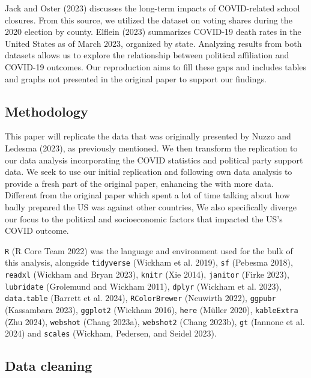 \documentclass[
  letterpaper,
  DIV=11,
  numbers=noendperiod]{scrartcl}
\begin{document}
Jack and Oster (2023) discusses the long-term impacts of COVID-related
school closures. From this source, we utilized the dataset on voting
shares during the 2020 election by county. Elflein (2023) summarizes
COVID-19 death rates in the United States as of March 2023, organized by
state. Analyzing results from both datasets allows us to explore the
relationship between political affiliation and COVID-19 outcomes. Our
reproduction aims to fill these gaps and includes tables and graphs not
presented in the original paper to support our findings.

\hypertarget{methodology}{%
\subsection{Methodology}\label{methodology}}

This paper will replicate the data that was originally presented by
Nuzzo and Ledesma (2023), as previously mentioned. We then transform the
replication to our data analysis incorporating the COVID statistics and
political party support data. We seek to use our initial replication and
following own data analysis to provide a fresh part of the original
paper, enhancing the with more data. Different from the original paper
which spent a lot of time talking about how badly prepared the US was
against other countries, We also specifically diverge our focus to the
political and socioeconomic factors that impacted the US's COVID
outcome.

\texttt{R} (R Core Team 2022) was the language and environment used for
the bulk of this analysis, alongside \texttt{tidyverse} (Wickham et al.
2019), \texttt{sf} (Pebesma 2018), \texttt{readxl} (Wickham and Bryan
2023), \texttt{knitr} (Xie 2014), \texttt{janitor} (Firke 2023),
\texttt{lubridate} (Grolemund and Wickham 2011), \texttt{dplyr} (Wickham
et al. 2023), \texttt{data.table} (Barrett et al. 2024),
\texttt{RColorBrewer} (Neuwirth 2022), \texttt{ggpubr} (Kassambara
2023), \texttt{ggplot2} (Wickham 2016), \texttt{here} (Müller 2020),
\texttt{kableExtra} (Zhu 2024), \texttt{webshot} (Chang 2023a),
\texttt{webshot2} (Chang 2023b), \texttt{gt} (Iannone et al. 2024) and
\texttt{scales} (Wickham, Pedersen, and Seidel 2023).

\hypertarget{data-cleaning}{%
\subsection{Data cleaning}\label{data-cleaning}}
\end{document}
